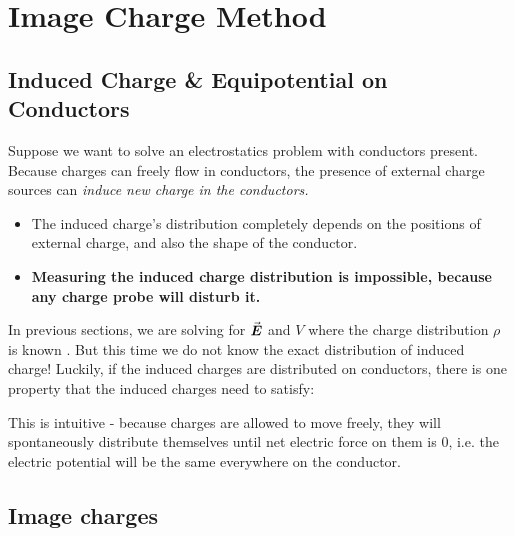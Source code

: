 \documentclass[class=article, crop=false, 12pt]{standalone}
\begin{document}
\linesep
\section{Image Charge Method}

\subsection{Induced Charge \& Equipotential on Conductors}

Suppose we want to solve an electrostatics problem with conductors present.
Because charges can freely flow in conductors,
the presence of external charge sources can \it{induce} new charge in the conductors.
\begin{itemize}
    \item The induced charge's distribution completely depends on the positions of external charge,
    and also the shape of the conductor.

    \item \bf{Measuring the induced charge distribution is impossible}, 
    because any charge probe will disturb it.
\end{itemize}


In previous sections, 
we are solving for $\va*{E}$ and $V$ where the charge distribution $\rho$ is known .
But this time we do not know the exact distribution of induced charge!
Luckily, if the induced charges are distributed on conductors,
there is one property that the induced charges need to satisfy:

\begin{center}
\end{center}

This is intuitive - because charges are allowed to move freely,
they will spontaneously distribute themselves until net electric force on them is $0$,
i.e. the electric potential will be the same everywhere on the conductor.




\subsection{Image charges}
\end{document}
